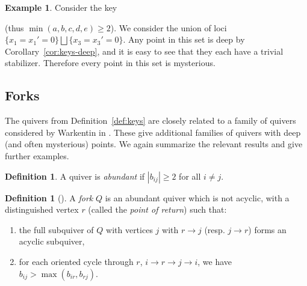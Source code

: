 \documentclass{amsart}
\numberwithin{equation}{section}
\theoremstyle{definition}
\newtheorem{definition}[theorem]{Definition}
\newtheorem{example}[theorem]{Example}
\begin{document}
\begin{example}
Consider the key 

\begin{center}
\end{center}
(thus $\min(a,b,c,d,e)\geq 2$). We consider the union of loci  $\{x_1 = x_1' = 0\} \bigsqcup\{x_3 = x_3' = 0\}$. %
Any point in this set is deep by Corollary~\ref{cor:keys-deep}, and it is easy to see that they each have a trivial stabilizer. %
Therefore every point in this set is mysterious.
\end{example}


\subsection{Forks}
The quivers from Definition~\ref{def:keys} are closely related to a family of quivers considered by Warkentin in \cite{warkentinThesis}. These give additional families of quivers with deep (and often mysterious) points. We again summarize the relevant results and give further examples.

\begin{definition}\label{def:abundant}
A quiver is \emph{abundant} if $|b_{ij}| \geq 2$ for all $i \neq j$.
\end{definition}

\begin{definition}[{\cite[Definition 2.1]{warkentinThesis}}]\label{def:fork}
A \emph{fork} $Q$ is an abundant quiver which is not acyclic, with a distinguished vertex $r$ (called the \emph{point of return}) such that:
\begin{enumerate}
    \item the full subquiver of $Q$ with vertices $j$ with $r \rightarrow j$ (resp. $j \rightarrow r$) forms an acyclic subquiver,
    \item for each oriented cycle through $r$, $i \rightarrow r \rightarrow j \rightarrow i$, we have $b_{ij} > \max(b_{ir}, b_{rj}).$
\end{enumerate}
\end{definition}
\end{document}
